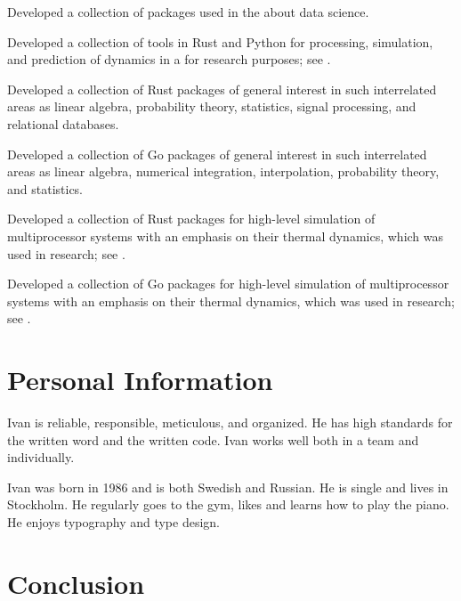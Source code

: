 \documentclass[journal]{IEEEtran}
\begin{document}
\emph{} Developed a collection of packages used in the
 about data science.

\emph{} Developed a collection of tools in Rust and
Python for processing, simulation, and prediction of dynamics in a
 for research
purposes; see .

\emph{} Developed a collection of Rust packages of general
interest in such interrelated areas as linear algebra, probability theory,
statistics, signal processing, and relational databases.

\emph{} Developed a collection of Go packages of general interest in such
interrelated areas as linear algebra, numerical integration, interpolation,
probability theory, and statistics.

\emph{} Developed a collection of Rust packages for high-level simulation of
multiprocessor systems with an emphasis on their thermal dynamics, which was
used in research; see .

\emph{} Developed a collection of Go packages for
high-level simulation of multiprocessor systems with an emphasis on their
thermal dynamics, which was used in research; see .

\section{Personal Information} 

Ivan is reliable, responsible, meticulous, and organized. He has high standards
for the written word and the written code. Ivan works well both in a team and
individually.

Ivan was born in 1986 and is both Swedish and Russian. He is single and lives in
Stockholm. He regularly goes to the gym, likes
 and learns how
to play the piano. He enjoys typography and type design.

\section{Conclusion} 

\begingroup
  
  
\endgroup
\end{document}

